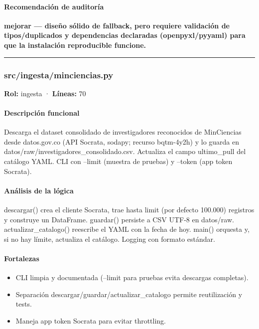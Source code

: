 \paragraph{Recomendación de auditoría}
\textbf{mejorar --- diseño sólido de fallback, pero requiere validación de tipos/duplicados y dependencias declaradas (openpyxl/pyyaml) para que la instalación reproducible funcione.}

\medskip
\hrule

\subsubsection{src/ingesta/minciencias.py}
\textbf{Rol:} ingesta · \textbf{Líneas:} 70

\paragraph{Descripción funcional}
Descarga el dataset consolidado de investigadores reconocidos de MinCiencias desde datos.gov.co (API Socrata, sodapy; recurso bqtm-4y2h) y lo guarda en datos/raw/investigadores\_consolidado.csv. Actualiza el campo ultimo\_pull del catálogo YAML. CLI con --limit (muestra de pruebas) y --token (app token Socrata).

\paragraph{Análisis de la lógica}
descargar() crea el cliente Socrata, trae hasta limit (por defecto 100.000) registros y construye un DataFrame. guardar() persiste a CSV UTF-8 en datos/raw. actualizar\_catalogo() reescribe el YAML con la fecha de hoy. main() orquesta y, si no hay límite, actualiza el catálogo. Logging con formato estándar.

\paragraph{Fortalezas}
\begin{itemize}
  \item CLI limpia y documentada (--limit para pruebas evita descargas completas).
  \item Separación descargar/guardar/actualizar\_catalogo permite reutilización y tests.
  \item Maneja app token Socrata para evitar throttling.
\end{itemize}

